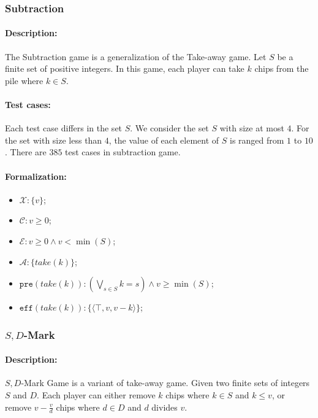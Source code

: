 \documentclass[review]{elsarticle}
\newcommand{\set}[1]{\{ #1 \}}
\newcommand{\tuple}[1]{\langle {#1} \rangle}
\newcommand{\true}{\top}
\newcommand{\statevar}{\mathcal{X}}
\newcommand{\act}{\mathcal{A}}
\newcommand{\constraint}{\mathcal{C}}
\newcommand{\estate}{\mathcal{E}}
\newcommand{\pre}{\mathtt{pre}}
\newcommand{\eff}{\mathtt{eff}}
\begin{document}
\subsubsection{Subtraction \protect\cite{Yag2001}}

\paragraph{Description:} 
The Subtraction game is a generalization of the Take-away game.
Let $S$ be a finite set of positive integers.
In this game, each player can take $k$ chips from the pile where $ k \in S$.

\paragraph{Test cases:}
Each test case differs in the set $S$. %
We consider the set $S$ with size at most $4$.
For the set with size less than $4$, the value of each element of $S$ is ranged from $1$ to $10$.
There are $385$ test cases in subtraction game.

\paragraph{Formalization:}

\begin{itemize}
	\item $\statevar: \set{v}$;
	\item $\constraint: v \ge 0 $;
	\item $\estate:  v \ge 0 \wedge v < \min(S) $;
	\item $\act: \set{take(k)}$;
	\item $\pre(take(k)) : (\bigvee_{s \in S} k = s) \land v \geq \min(S) $;
	\item $\eff(take(k)) : \set{\tuple{\true, v, v-k}}$;
\end{itemize}

\subsubsection{$S,D$-Mark \protect\cite{Sop2016}}

\paragraph{Description:}
$S, D$-Mark Game is a variant of take-away game.
Given two finite sets of integers $S$ and $D$. 
Each player can either remove $k$ chips where $k \in S$ and $k \le v$, or remove $v - \frac{v}{d}$ chips where $d \in D $ and $d$ divides $v$. 
\end{document}
